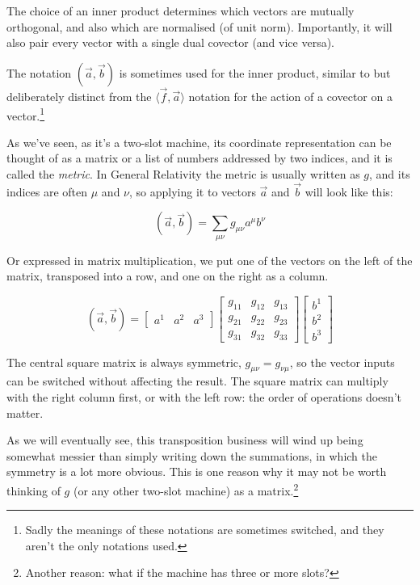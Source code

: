 The choice of an inner product determines which vectors are mutually orthogonal, and also which are normalised (of unit norm). Importantly, it will also pair every vector with a single dual covector (and vice versa).

The notation $(\vec{a},\vec{b})$ is sometimes used for the inner product, similar to but deliberately distinct from the $\langle \vec{f},\vec{a}\rangle$ notation for the action of a covector on a vector.\footnote{Sadly the meanings of these notations are sometimes switched, and they aren't the only notations used.}

As we've seen, as it's a two-slot machine, its coordinate representation can be thought of as a matrix or a list of numbers addressed by two indices, and it is called the \textit{metric}. In General Relativity the metric is usually written as $g$, and its indices are often $\mu$ and $\nu$, so applying it to vectors $\vec{a}$ and $\vec{b}$ will look like this:

$$
(\vec{a},\vec{b}) = \sum_{\mu\nu} g_{\mu\nu} a^\mu b^\nu
$$

Or expressed in matrix multiplication, we put one of the vectors on the left of the matrix, transposed into a row, and one on the right as a column.

$$
(\vec{a}, \vec{b}) =
\begin{bmatrix}
a^1 & a^2 & a^3
\end{bmatrix}
\begin{bmatrix}
g_{11} & g_{12} & g_{13} \\
g_{21} & g_{22} & g_{23} \\
g_{31} & g_{32} & g_{33}
\end{bmatrix}
\begin{bmatrix}
b^1 \\ b^2 \\ b^3
\end{bmatrix}
$$

The central square matrix is always symmetric, $g_{\mu\nu} = g_{\nu\mu}$, so the vector inputs can be switched without affecting the result. The square matrix can multiply with the right column first, or with the left row: the order of operations doesn't matter.

As we will eventually see, this transposition business will wind up being somewhat messier than simply writing down the summations, in which the symmetry is a lot more obvious. This is one reason why it may not be worth thinking of $g$ (or any other two-slot machine) as a matrix.\footnote{Another reason: what if the machine has three or more slots?}

